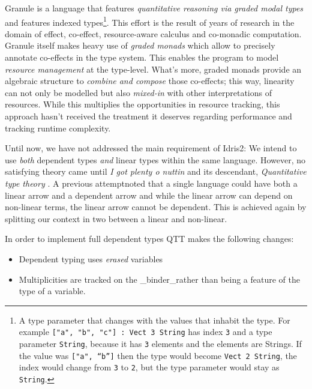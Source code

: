 \documentclass[
]{article}
\providecommand{\tightlist}{%
  \setlength{\itemsep}{0pt}\setlength{\parskip}{0pt}}
\begin{document}
Granule is a language that features \emph{quantitative reasoning via
graded modal types} and features indexed types\footnote{A type parameter
  that changes with the values that inhabit the type. For example
  \texttt{{[}"a",\ "b",\ "c"{]}\ :\ Vect\ 3\ String} has index
  \texttt{3} and a type parameter \texttt{String}, because it has
  \texttt{3} elements and the elements are Strings. If the value was
  \texttt{{[}\textasciigrave{}"a",\ “b”{]}} then the type would become
  \texttt{Vect\ 2\ String}, the index would change from \texttt{3} to
  \texttt{2}, but the type parameter would stay as \texttt{String}.}.
This effort is the result of years of research in the domain of effect,
co-effect, resource-aware calculus and co-monadic
computation\cite{monad_or_comonad}. Granule itself makes heavy use of
\emph{graded monads}\cite{effect_coeffects_grading} which allow to
precisely annotate co-effects\cite{coeffect_computation} in the type
system. This enables the program to model \emph{resource management} at
the type-level. What's more, graded monads provide an algebraic
structure to \emph{combine and compose} those
co-effects\cite{quantitative_coeffects}; this way, linearity can not
only be modelled but also \emph{mixed-in} with other interpretations of
resources. While this multiplies the opportunities in resource tracking,
this approach hasn't received the treatment it deserves regarding
performance and tracking runtime complexity.

Until now, we have not addressed the main requirement of Idris2: We
intend to use \emph{both} dependent types \emph{and} linear types within
the same language. However, no satisfying theory came until \emph{I got
plenty o nuttin}\cite{nuttin} and its descendant, \emph{Quantitative
type theory} \cite{qtt}. A previous
attempt\cite{integrating_linear_dependent}noted that a single language
could have both a linear arrow and a dependent arrow and while the
linear arrow can depend on non-linear terms, the linear arrow cannot be
dependent. This is achieved again by splitting our context in two
between a linear and non-linear.

In order to implement full dependent types QTT makes the following
changes:

\begin{itemize}
\tightlist
\item
  Dependent typing uses \emph{erased} variables
\item
  Multiplicities are tracked on the \_binder\_rather than being a
  feature of the type of a variable.
\end{itemize}
\end{document}
